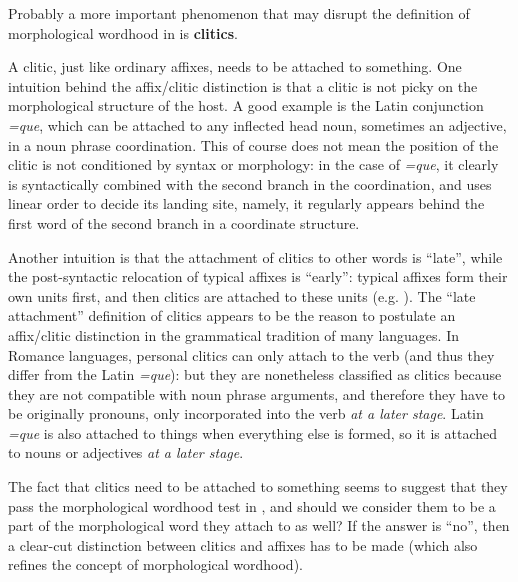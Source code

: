 \documentclass[a4paper, oneside, scheme=plain, 12pt]{article}
\newcommand*{\citepage}[1]{p.~{#1}}
\newcommand*{\concept}[1]{\textbf{#1}}
\newcommand{\form}[1]{\emph{#1}}
\begin{document}
Probably a more important phenomenon that may disrupt the definition of morphological wordhood in  is \concept{clitics}.

A clitic, just like ordinary affixes, needs to be attached to something.
One intuition behind the affix/clitic distinction is that a clitic is not picky on the morphological structure of the host.
A good example is the Latin conjunction \form{=que},
which can be attached to any inflected head noun,
sometimes an adjective, in a noun phrase coordination.
This of course does not mean the position of the clitic is not conditioned by syntax or morphology:
in the case of \form{=que}, it clearly is syntactically combined with the second branch in the coordination,
and uses linear order to decide its landing site, namely, it regularly appears behind the first word of the second branch in a coordinate structure.

Another intuition is that the attachment of clitics to other words is ``late'',
while the post-syntactic relocation of typical affixes is ``early'':
typical affixes form their own units first, and then clitics are attached to these units
(e.g. \citealt[\citepage{485}]{jacques2021grammar}).
The ``late attachment'' definition of clitics appears to be the reason to postulate an affix/clitic distinction in the grammatical tradition of many languages.
In Romance languages, personal clitics can only attach to the verb (and thus they differ from the Latin \form{=que}):
but they are nonetheless classified as clitics because they are not compatible with noun phrase arguments,
and therefore they have to be originally pronouns,
only incorporated into the verb \emph{at a later stage}.
Latin \form{=que} is also attached to things when everything else is formed,
so it is attached to nouns or adjectives \emph{at a later stage}.

The fact that clitics need to be attached to something
seems to suggest that they pass the morphological wordhood test in ,
and should we consider them to be a part of the morphological word they attach to as well?
If the answer is ``no'', then a clear-cut distinction between clitics and affixes has to be made
(which also refines the concept of morphological wordhood).
\end{document}
